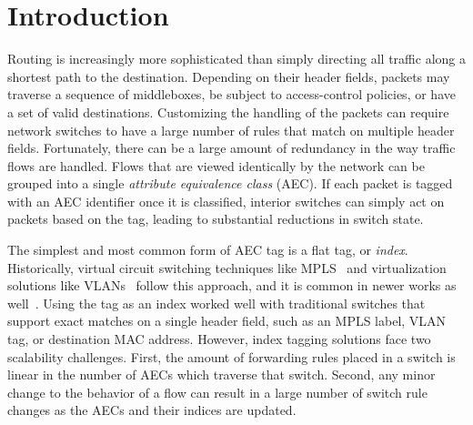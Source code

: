 \section{Introduction}
\label{sec:intro}
Routing is increasingly more sophisticated than simply directing all traffic along a shortest path to the destination.  Depending on their header fields, packets may traverse a sequence of middleboxes, be subject to access-control policies, or have a set of valid destinations.  Customizing the handling of the packets can require network switches to have a large number of rules that match on multiple header fields.  Fortunately, there can be a large amount of redundancy in the way traffic flows are handled.  Flows that are viewed identically by the network can be grouped into a single \emph{attribute equivalence class} (AEC). If each packet is tagged with an AEC identifier once it is classified, interior switches can simply act on packets based on the tag, leading to substantial reductions in switch state.

The simplest and most common form of AEC tag is a flat tag, or \emph{index}. Historically, virtual circuit switching techniques like MPLS~\cite{mpls} and virtualization solutions like VLANs~\cite{vlan} follow this approach, and it is common in newer works as well~\cite{flowtags,sdx}.  Using the tag as an index worked well with traditional switches that support exact matches on a single header field, such as an MPLS label, VLAN tag, or destination MAC address.  However, index tagging solutions face two scalability challenges. First, the amount of forwarding rules placed in a switch is linear in the number of AECs which traverse that switch. Second, any minor change to the behavior of a flow can result in a large number of switch rule changes as the AECs and their indices are updated.

